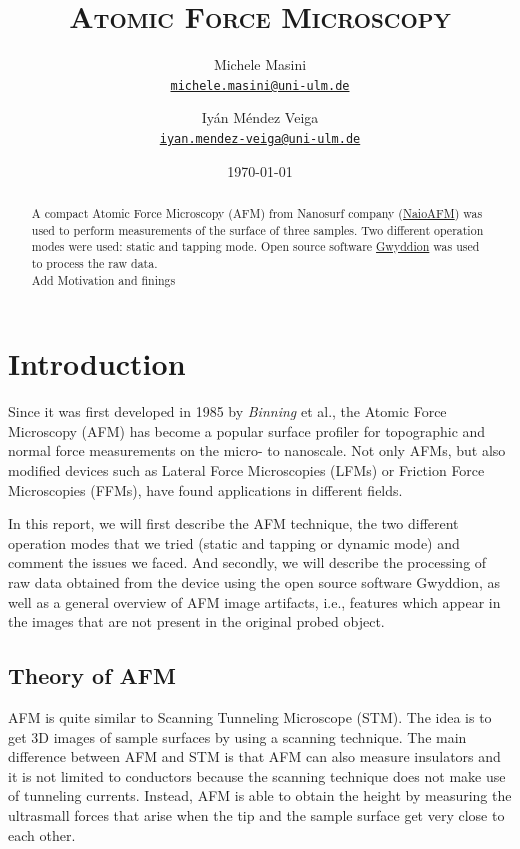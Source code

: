 \documentclass[11pt,a4paper]{article}
\title{\bfseries\textsc{Atomic Force Microscopy}}
\author{
Michele Masini\\ \small\texttt{\href{mailto:michele.masini@uni-ulm.de}{michele.masini@uni-ulm.de}}\and
Iyán Méndez Veiga\\ \small\texttt{\href{mailto:iyan.mendez-veiga@uni-ulm.de}{iyan.mendez-veiga@uni-ulm.de}}
}
\date{\today}
\begin{document}
\maketitle

\begin{abstract}
A compact Atomic Force Microscopy (AFM) from Nanosurf company (\href{https://www.nanosurf.com/en/products/naioafm-the-leading-compact-afm}{NaioAFM}) was used to perform measurements of the surface of three samples. Two different operation modes were used: static and tapping mode. Open source software \href{http://gwyddion.net/}{Gwyddion} was used to process the raw data.\\{\color{red} Add Motivation and finings}
\end{abstract}

\vspace{1.5cm}

\section{Introduction}

Since it was first developed in 1985 by \emph{Binning} et al., the Atomic Force Microscopy (AFM) \cite{Bhushan} has become a popular surface profiler for topographic and normal force measurements on the micro- to nanoscale. Not only AFMs, but also modified devices such as Lateral Force Microscopies (LFMs) or Friction Force Microscopies (FFMs), have found applications in different fields.

In this report, we will first describe the AFM technique, the two different operation modes that we tried (static and tapping or dynamic mode) and comment the issues we faced. And secondly, we will describe the processing of raw data obtained from the device using the open source software Gwyddion, as well as a general overview of AFM image artifacts, i.e., features which appear in the images that are not present in the original probed object.

\subsection{Theory of AFM}

AFM is quite similar to Scanning Tunneling Microscope (STM). The idea is to get 3D images of sample surfaces by using a scanning technique. The main difference between AFM and STM is that AFM can also measure insulators and it is not limited to conductors because the scanning technique does not make use of tunneling currents. Instead, AFM is able to obtain the height by measuring the ultrasmall forces that arise when the tip and the sample surface get very close to each other.
\end{document}
